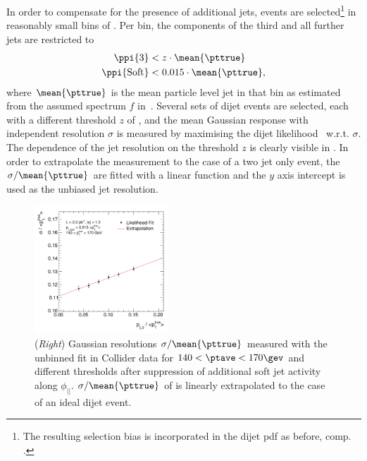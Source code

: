 In order to compensate for the presence of additional jets,
events are selected\footnote{The resulting selection bias is incorporated in the dijet pdf as
before, comp. .} in reasonably small bins of \ptave.
Per bin, the \pp components of the third and all further jets are restricted to
\begin{align}
  \label{eq:ResFit:ThirdJetSelection}
  \begin{split}
    \ppi{3}                & < z\cdot\mean{\pttrue} \\
    \ppi{\text{Soft}}  & < 0.015\cdot\mean{\pttrue},
 \end{split}
\end{align}
where $\mean{\pttrue}$ is the mean particle level jet \pt in that bin
as estimated from the assumed spectrum
$f$ in~.
Several sets of dijet events are selected, each with a different
threshold $z$ of , and the mean Gaussian response with \pt
independent resolution $\sigma$ is measured by maximising the dijet
likelihood~ w.r.t. $\sigma$.
The dependence of the jet \pt resolution on the threshold $z$ is
clearly visible in .
In order to extrapolate the measurement to the case of a two jet only
event, the \mbox{$\sigma/\mean{\pttrue}$} are fitted with a linear
function and the $y$ axis intercept is used as the unbiased jet \pt
resolution.

\begin{figure}[ht]
 \centering
 \includegraphics[width=0.45\textwidth]{figures/MaxLike_Data132440-144011_Eta00-13_ExtrapolatedPar0_PtBin4}
 \caption{(\textit{Right}) Gaussian resolutions \mbox{$\sigma/\mean{\pttrue}$} measured with the unbinned
    fit in Collider data for \mbox{$140 < \ptave < 170\gev$} and different 
    thresholds after suppression of additional soft jet activity along
    $\phi_{||}$. 
    \mbox{$\sigma/\mean{\pttrue}$} of  is linearly
    extrapolated to the case of an ideal dijet event.
  }
  \label{fig:ResFit:DataDriven:AddJets:Corr}
\end{figure}

